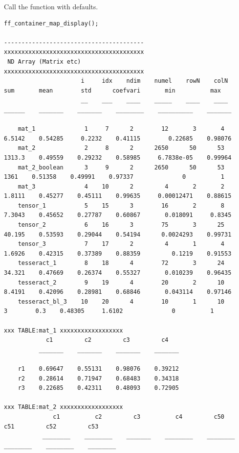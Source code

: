 \documentclass[
]{book}
\begin{document}
Call the function with defaults.

\begin{verbatim}
ff_container_map_display();

----------------------------------------
xxxxxxxxxxxxxxxxxxxxxxxxxxxxxxxxxxxxxxxx
 ND Array (Matrix etc)
xxxxxxxxxxxxxxxxxxxxxxxxxxxxxxxxxxxxxxxx
                      i     idx    ndim    numel    rowN    colN     sum       mean        std      coefvari       min          max  
                      __    ___    ____    _____    ____    ____    ______    _______    _______    ________    __________    _______

    mat_1              1     7      2        12       3       4     6.5142    0.54285     0.2232    0.41115        0.22685    0.98076
    mat_2              2     8      2      2650      50      53     1313.3    0.49559    0.29232    0.58985     6.7838e-05    0.99964
    mat_2_boolean      3     9      2      2650      50      53       1361    0.51358    0.49991    0.97337              0          1
    mat_3              4    10      2         4       2       2     1.8111    0.45277    0.45111    0.99635     0.00012471    0.88615
    tensor_1           5    15      3        16       2       8     7.3043    0.45652    0.27787    0.60867       0.018091     0.8345
    tensor_2           6    16      3        75       3      25     40.195    0.53593    0.29044    0.54194      0.0024293    0.99731
    tensor_3           7    17      2         4       1       4     1.6926    0.42315    0.37389    0.88359         0.1219    0.91553
    tesseract_1        8    18      4        72       3      24     34.321    0.47669    0.26374    0.55327       0.010239    0.96435
    tesseract_2        9    19      4        20       2      10     8.4191    0.42096    0.28981    0.68846       0.043114    0.97146
    tesseract_bl_3    10    20      4        10       1      10          3        0.3    0.48305     1.6102              0          1

xxx TABLE:mat_1 xxxxxxxxxxxxxxxxxx
            c1         c2         c3         c4   
          _______    _______    _______    _______

    r1    0.69647    0.55131    0.98076    0.39212
    r2    0.28614    0.71947    0.68483    0.34318
    r3    0.22685    0.42311    0.48093    0.72905

xxx TABLE:mat_2 xxxxxxxxxxxxxxxxxx
              c1          c2         c3          c4         c50         c51         c52         c53   
           ________    ________    _______    ________    ________    ________    ________    ________


\end{verbatim}
\end{document}
